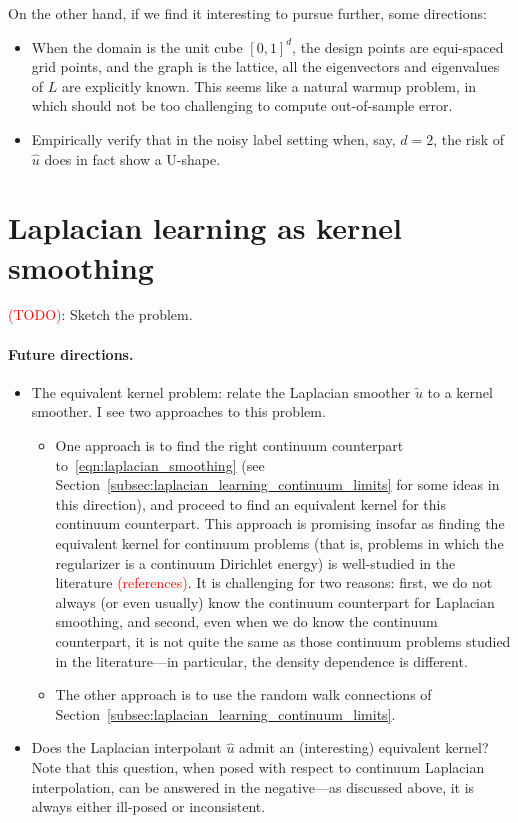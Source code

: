 \documentclass{article}
\newcommand{\1}{\mathbf{1}}
\newcommand{\wt}[1]{\widetilde{#1}}
\newcommand{\wh}[1]{\widehat{#1}}
\theoremstyle{definition}
\theoremstyle{remark}
\begin{document}
On the other hand, if we find it interesting to pursue further, some directions:
\begin{itemize}
	\item When the domain is the unit cube $[0,1]^d$, the design points are equi-spaced grid points, and the graph is the lattice, all the eigenvectors and eigenvalues of $L$ are explicitly known. This seems like a natural warmup problem, in which should not be too challenging to compute out-of-sample error.
	\item Empirically verify that in the noisy label setting when, say, $d = 2$, the risk of $\wh{u}$ does in fact show a U-shape.
\end{itemize}

\section{Laplacian learning as kernel smoothing}
\textcolor{red}{(TODO)}: Sketch the problem.

\paragraph{Future directions.}
\begin{itemize}
	\item The equivalent kernel problem: relate the Laplacian smoother $\wt{u}$ to a kernel smoother. I see two approaches to this problem.
	\begin{itemize}
		\item One approach is to find the right continuum counterpart to~\eqref{eqn:laplacian_smoothing} (see Section~\ref{subsec:laplacian_learning_continuum_limits} for some ideas in this direction), and proceed to find an equivalent kernel for this continuum counterpart. This approach is promising insofar as finding the equivalent kernel for continuum problems (that is, problems in which the regularizer is a continuum Dirichlet energy) is well-studied in the literature \textcolor{red}{(references)}. It is challenging for two reasons: first, we do not always (or even usually) know the continuum counterpart for Laplacian smoothing, and second, even when we do know the continuum counterpart, it is not quite the same as those continuum problems studied in the literature---in particular, the density dependence is different.
		\item The other approach is to use the random walk connections of Section~\ref{subsec:laplacian_learning_continuum_limits}.
	\end{itemize}
	\item Does the Laplacian interpolant $\wh{u}$ admit an (interesting) equivalent kernel? Note that this question, when posed with respect to continuum Laplacian interpolation,  can be answered in the negative---as discussed above, it is always either ill-posed or inconsistent.
\end{itemize}
\end{document}
